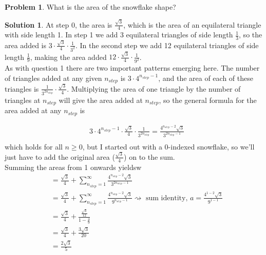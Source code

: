 \documentclass[10pt]{article}
\theoremstyle{definition}
\newtheorem{problem}{Problem}
\newtheorem{soln}{Solution}
\begin{document}
\begin{problem}
What is the area of the snowflake shape?
\end{problem}
\begin{soln}
    At step 0, the area is $\frac{\sqrt{3}}{4}$, which is the area of an equilateral triangle with side length 1. In step 1 we add 3 equilateral triangles of side length $\frac{1}{3}$, so the area added is
    $3\cdot\frac{\sqrt{3}}{4}\cdot\frac{1}{3^2}$. In the second step we add 12 equilateral triangles of side length $\frac{1}{9}$, making the area added $12\cdot\frac{\sqrt{3}}{4}\cdot\frac{1}{9^2}$.\\

    As with question 1 there are two important patterns emerging here. The number of triangles added at any given $n_{step}$ is $3\cdot 4^{n_{step}-1}$, and the area of each of these triangles is
    $\frac{1}{3^{2n_{step}}}\cdot\frac{\sqrt{3}}{4}$. Multiplying the area of one triangle by the number of triangles at $n_{step}$ will give the area added at $n_{step}$, so the general formula for the
    area added at any $n_{step}$ is

    \begin{align*}
         & 3\cdot 4^{n_{step}-1}\cdot\frac{\sqrt{3}}{4}\cdot\frac{1}{3^{2n_{step}}}=\frac{4^{n_{step}-2}\sqrt{3}}{3^{2n_{step}-1}} \\
    \end{align*}
    \noindent which holds for all $n\geq0$, but I started out with a 0-indexed snowflake, so we'll just have to add the original area ($\frac{\sqrt{3}}{4}$) on to the sum. \\

    \noindent Summing the areas from 1 onwards yieldsw
    \begin{align*}
         & = \frac{\sqrt{3}}{4}+\sum_{n_{step}=1}^{\infty}\frac{4^{n_{step}-2}\sqrt{3}}{3^{2n_{step}-1}}                                                                          \\
         & = \frac{\sqrt{3}}{4}+\sum_{n_{step}=1}^{\infty}\frac{4^{n_{step}-2}\sqrt{3}}{9^{n_{step}-1}} \rightsquigarrow \text{ sum identity, } a=\frac{4^{1-2}\sqrt{3}}{9^{1-1}} \\
         & = \frac{\sqrt{3}}{4}+\frac{\frac{\sqrt{3}}{12}}{1-\frac{4}{9}}                                                                                                         \\
         & = \frac{\sqrt{3}}{4}+\frac{3\sqrt{3}}{20}                                                                                                                              \\
         & = \frac{2\sqrt{3}}{5}                                                                                                                                                  \\
    \end{align*}


\end{soln}
\end{document}

